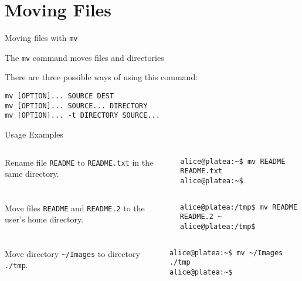 \section{Moving Files}
\begin{frame}[fragile]{Moving files with \alert{\texttt{mv}}}


  \begin{block}{The  \texttt{mv} command moves files and directories}
    {\footnotesize
      There are three possible ways of using this command:
    

      \begin{lstlisting}
mv [OPTION]... SOURCE DEST
mv [OPTION]... SOURCE... DIRECTORY
mv [OPTION]... -t DIRECTORY SOURCE...
      \end{lstlisting}
 

  Usage Examples
}

  {\scriptsize

  \begin{columns}[T]
       Rename file \texttt{README} to
      \texttt{README.txt} in the same directory.
        \hspace{-3cm}
        \begin{lstlisting}
alice@platea:~$ mv README README.txt
alice@platea:~$ 
        \end{lstlisting}
    \end{columns}
  \begin{columns}[T]
       Move files \texttt{README} and
      \texttt{README.2} to the user's home directory.
        \hspace{-3cm}
        \begin{lstlisting}
alice@platea:/tmp$ mv README README.2 ~
alice@platea:/tmp$ 
        \end{lstlisting}
    \end{columns}
  \begin{columns}[T]
       Move directory
    \texttt{\textasciitilde/Images} to directory \texttt{./tmp}.
        \hspace{-3cm}
        \begin{lstlisting}
alice@platea:~$ mv ~/Images ./tmp
alice@platea:~$
        \end{lstlisting}
    \end{columns}
}
  \end{block}
  

\end{frame}
